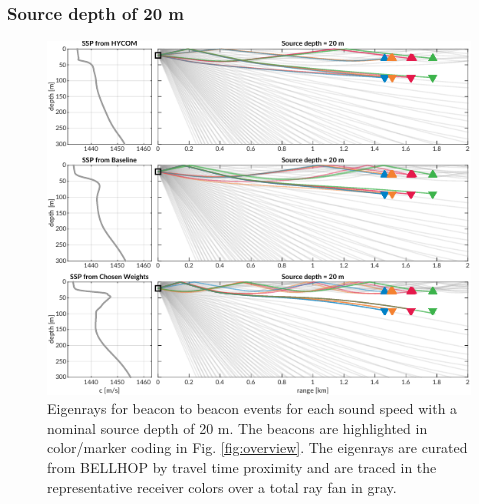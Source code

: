 \subsubsection{Source depth of 20 m}
\begin{figure}[ht!]
  \centering
  \includegraphics[width=\reprintcolumnwidth]{figs/raytrace-3env-zs-20.pdf}
  \caption{Eigenrays for beacon to beacon events for each sound speed with a nominal source depth of 20 m. The beacons are highlighted in color/marker coding in Fig. \ref{fig:overview}. The eigenrays are curated from BELLHOP by travel time proximity and are traced in the representative receiver colors over a total ray fan in gray.}
  \label{fig:raytrace-zs20}
\end{figure}

